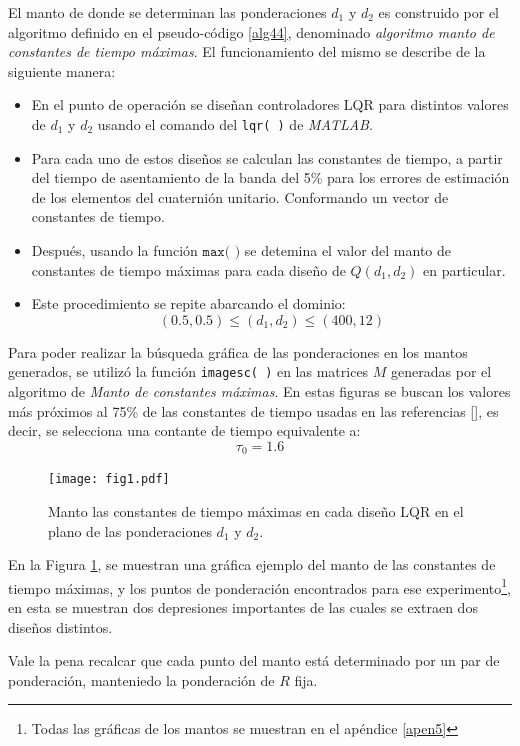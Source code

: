 \documentclass[10pt]{report}
\numberwithin{equation}{chapter}
\numberwithin{algorithm}{chapter}
\newcommand{\bcite}[1]{[\cite{#1}]}
\begin{document}
El manto de donde se determinan las ponderaciones $d_1$ y $d_2$ es construido por el algoritmo definido en el pseudo-código \ref{alg44}, denominado \emph{algoritmo manto de constantes de tiempo máximas}. El funcionamiento del mismo se describe de la siguiente manera: 
\begin{itemize}
\item En el punto de operación se diseñan controladores LQR para distintos valores de $d_1$ y $d_2$ usando el comando del \texttt{lqr(~)} de \textsl{MATLAB}.
 \item Para cada uno de estos diseños se calculan las constantes de tiempo, a partir del tiempo de asentamiento de la banda del 5\% para los errores de estimación de los elementos del cuaternión unitario. Conformando un vector de constantes de tiempo.
\item Después, usando la función $\texttt{max(~)}$ se detemina el valor del manto de constantes de tiempo máximas para cada diseño de $Q(d_1,d_2)$ en particular.
\item Este procedimiento se repite abarcando el dominio:
$$(0.5,0.5)\leq(d_1,d_2)\leq(400,12)$$
\end{itemize}
Para poder realizar la búsqueda gráfica de las ponderaciones en los mantos generados, se utilizó la función \texttt{imagesc(~)} en las matrices $M$ generadas por el algoritmo de \emph{Manto de constantes máximas}. En estas figuras se buscan los valores más próximos al 75\% de las constantes de tiempo usadas en las referencias \bcite{Scandaro2011a,Scandaro2011,Mahony2008}, es decir, se selecciona una contante de tiempo equivalente a:
\begin{equation*}\label{tau0}
\tau_0=1.6
\end{equation*}
\begin{figure}
\centering
\texttt{[image: fig1.pdf]}
\caption{Manto las constantes de tiempo máximas en cada diseño LQR en el plano de las ponderaciones $d_1$ y $d_2$.}
\label{ekf_fig2}
\end{figure}
En la Figura \ref{ekf_fig2}, se muestran una gráfica ejemplo del manto de las constantes de tiempo máximas, y los puntos de ponderación encontrados para ese experimento\footnote{Todas las gráficas de los mantos se muestran en el apéndice \ref{apen5}}, en esta se muestran dos depresiones importantes de las cuales se extraen dos diseños distintos. \par
Vale la pena recalcar que cada punto del manto está determinado por un par de ponderación, manteniedo la ponderación de $R$ fija.\par
\end{document}
